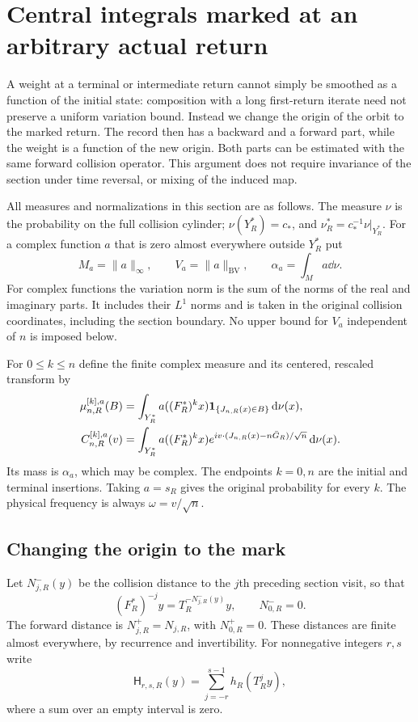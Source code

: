 \section{Central integrals marked at an arbitrary actual return}
\label{sec:marked-return-band}
A weight at a terminal or intermediate return cannot simply be smoothed
as a function of the initial state: composition with a long first-return
iterate need not preserve a uniform variation bound. Instead we change
the origin of the orbit to the marked return. The record then has a
backward and a forward part, while the weight is a function of the new
origin. Both parts can be estimated with the same forward collision
operator. This argument does not require invariance of the section under
time reversal, or mixing of the induced map.

All measures and normalizations in this section are as follows. The
measure $\nu$ is the probability on the full collision cylinder;
$\nu(Y_R^*)=c_*$, and $\nu_R^*=c_*^{-1}\nu|_{Y_R^*}$. For a complex
function $a$ that is zero almost everywhere outside $Y_R^*$ put
\begin{equation}\label{eq:marked-norms}
 M_a=\|a\|_\infty,\qquad V_a=\|a\|_{\mathrm{BV}},\qquad
 \alpha_a=\int_M a\dd\nu.
\end{equation}
For complex functions the variation norm is the sum of the norms of the
real and imaginary parts. It includes their $L^1$ norms and is taken
in the original collision coordinates, including the section boundary.
No upper bound for $V_a$ independent of $n$ is imposed below.

For $0\le k\le n$ define the finite complex measure and its centered,
rescaled transform by
\begin{align}
 \mu^{[k],a}_{n,R}(B)
   &=\int_{Y_R^*}a((F_R^*)^kx)\mathbf1_{\{J_{n,R}(x)\in B\}}\,\mathrm d\nu(x),
       \label{eq:marked-measure}\\
 C^{[k],a}_{n,R}(v)
   &=\int_{Y_R^*}a((F_R^*)^kx)
          e^{iv\cdot(J_{n,R}(x)-n\bar G_R)/\sqrt n}\,\mathrm d\nu(x).
       \label{eq:marked-transform}
\end{align}
Its mass is $\alpha_a$, which may be complex. The endpoints $k=0,n$
are the initial and terminal insertions. Taking $a=s_R$ gives the
original probability for every $k$. The physical frequency is always
$\omega=v/\sqrt n$.

\subsection{Changing the origin to the mark}
Let $N^-_{j,R}(y)$ be the collision distance to the $j$th preceding
section visit, so that
\[
 (F_R^*)^{-j}y=T_R^{-N^-_{j,R}(y)}y,\qquad N^-_{0,R}=0.
\]
The forward distance is $N^+_{j,R}=N_{j,R}$, with $N^+_{0,R}=0$.
These distances are finite almost everywhere, by recurrence and
invertibility. For nonnegative integers $r,s$ write
\begin{equation}\label{eq:two-sided-collision-sum}
 \mathsf H_{r,s,R}(y)=\sum_{j=-r}^{s-1}h_R(T_R^jy),
\end{equation}
where a sum over an empty interval is zero.

